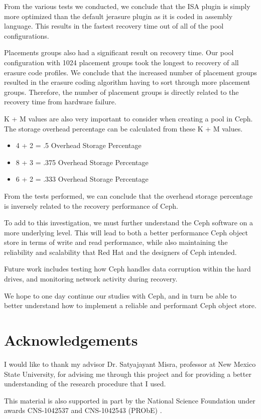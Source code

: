 \documentclass[conference,compsoc]{IEEEtran}
\begin{document}
From the various tests we conducted, we conclude that the ISA plugin is simply more optimized than the default jerasure plugin as it is coded in assembly language. This results in the fastest recovery time out of all of the pool configurations. 

Placements groups also had a significant result on recovery time. Our pool configuration with 1024 placement groups took the longest to recovery of all erasure code profiles. We conclude that the increased number of placement groups resulted in the erasure coding algorithm having to sort through more placement groups. Therefore, the number of placement groups is directly related to the recovery time from hardware failure.  

K + M values are also very important to consider when creating a pool in Ceph. The storage overhead percentage can be calculated from these K + M values. 

\begin{itemize}
\item 4 + 2 = .5 Overhead Storage Percentage
\item 8 + 3 = .375 Overhead Storage Percentage
\item 6 + 2 = .333 Overhead Storage Percentage
\end{itemize}

From the tests performed, we can conclude that the overhead storage percentage is inversely related to the recovery performance of Ceph. 

To add to this investigation, we must further understand the Ceph software on a more underlying level. This will lead to both a better performance Ceph object store in terms of write and read performance, while also maintaining the reliability and scalability that Red Hat and the designers of Ceph intended.

Future work includes testing how Ceph handles data corruption within the hard drives, and monitoring network activity during recovery. 

We hope to one day continue our studies with Ceph, and in turn be able to better understand how to implement a reliable and performant Ceph object store. 

\section{Acknowledgements}

I would like to thank my advisor Dr. Satyajayant Misra, professor at New Mexico State University, for advising me through this project and for providing a better understanding of the research procedure that I used. 

This material is also supported in part by the National Science Foundation under awards CNS-1042537 and CNS-1042543 (PRObE) \cite{Gibson+:login13}. 



\end{document}
